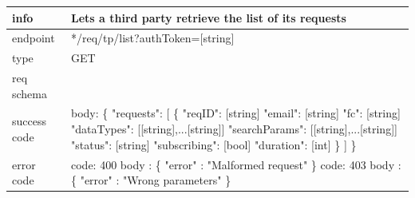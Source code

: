 \documentclass[titlepage]{article}
\begin{document}
\begin{tabularx}{\textwidth}{lX} \hline
    info & Lets a third party retrieve the list of its requests \\ \hline
    endpoint & */req/tp/list?authToken=[string] \\ \hline
    type & GET \\ \hline
    req schema & \\ \hline
    success code & body: \{ \newline
    "requests": [ \newline
    \{ \newline
    "reqID": [string] \newline
    "email": [string] \newline
    "fc": [string] \newline
    "dataTypes": [[string],...[string]] \newline
    "searchParams": [[string],...[string]] \newline
    "status": [string] \newline
    "subscribing": [bool] \newline
    "duration": [int] \newline
    \} \newline
    ] \newline
    \} \\ \hline
    error code &
        code: 400 \newline
        body : \{ "error" : "Malformed request" \} \newline \newline
        code: 403 \newline
        body : \{ "error" : "Wrong parameters" \}\\ \hline
\end{tabularx}
		
\vspace{\baselineskip}
\end{document}
